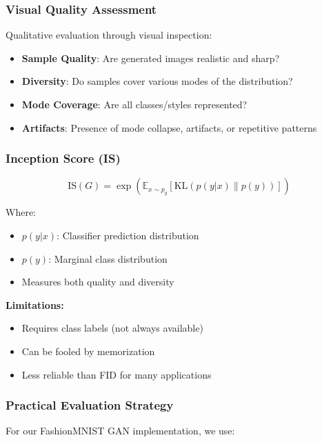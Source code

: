 \documentclass[conference,12pt]{IEEEtran}
\begin{document}
\subsubsection{Visual Quality Assessment}

Qualitative evaluation through visual inspection:

\begin{itemize}
    \item \textbf{Sample Quality}: Are generated images realistic and sharp?
    \item \textbf{Diversity}: Do samples cover various modes of the distribution?
    \item \textbf{Mode Coverage}: Are all classes/styles represented?
    \item \textbf{Artifacts}: Presence of mode collapse, artifacts, or repetitive patterns
\end{itemize}

\subsubsection{Inception Score (IS)}

\begin{equation}
    \text{IS}(G) = \exp\left( \mathbb{E}_{x \sim p_g} [\text{KL}(p(y|x) \| p(y))] \right)
\end{equation}

Where:
\begin{itemize}
    \item $p(y|x)$: Classifier prediction distribution
    \item $p(y)$: Marginal class distribution
    \item Measures both quality and diversity
\end{itemize}

\textbf{Limitations:}
\begin{itemize}
    \item Requires class labels (not always available)
    \item Can be fooled by memorization
    \item Less reliable than FID for many applications
\end{itemize}

\subsubsection{Practical Evaluation Strategy}

For our FashionMNIST GAN implementation, we use:
\end{document}
